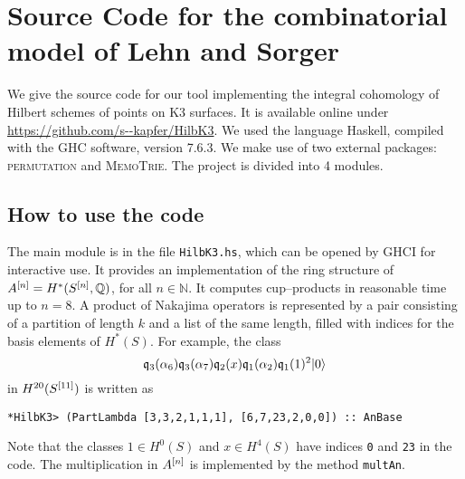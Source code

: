 
\section[Source Code for the combinatorial model of Lehn and Sorger]{Source Code for the combinatorial model of Lehn and Sorger%
}\label{IntCode}
We give the source code for our tool implementing the integral cohomology of Hilbert schemes of points on K3 surfaces. It is available online under \url{https://github.com/s--kapfer/HilbK3}. We used the language Haskell, compiled with the \textsc{GHC} software, version 7.6.3. We make use of two external packages: \textsc{permutation} and \textsc{MemoTrie}. The project is divided into 4 modules. 

\subsection{How to use the code}
The main module is in the file \verb|HilbK3.hs|, which can be opened by \textsc{GHCI} for interactive use. It provides an implementation of the ring structure of $A^{[n]}=H^*(S^{[n]},\mathbb{Q})$, for all $n\in\mathbb{N}$. 
It computes cup--products in reasonable time up to $n=8$.
A product of Nakajima operators is represented by a pair consisting of a partition of length $k$ and a list of the same length, filled with indices for the basis elements of $H^*(S)$. For example, the class
$$
\mathfrak{q}_{3}(\alpha_6)\mathfrak{q}_{3}(\alpha_7)\mathfrak{q}_2(x)\mathfrak{q}_{1}(\alpha_2)\mathfrak{q}_{1}(1)^2 |0\rangle 
$$
in $H^{20}(S^{[11]})$ is written as
\begin{verbatim}
*HilbK3> (PartLambda [3,3,2,1,1,1], [6,7,23,2,0,0]) :: AnBase 
\end{verbatim}
Note that the classes $1\in H^0(S)$ and $x\in H^4(S)$ have indices \verb|0| and \verb|23| in the code.
The multiplication in $A^{[n]}$ is implemented by the method \verb|multAn|. 

